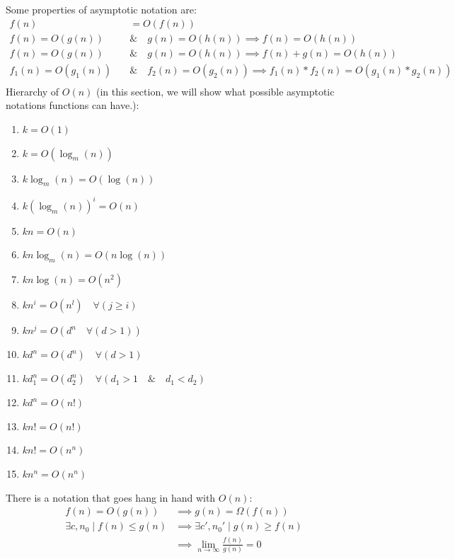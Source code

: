 \documentclass[nobib]{tufte-handout}
\begin{document}
Some properties of asymptotic notation are:
\begin{align*}
    f(n)                  & =O(f(n))                                                            \\
    f(n)=O(g(n))\quad     & \& \quad g(n) = O(h(n)) \implies f(n)=O(h(n))                       \\
    f(n)=O(g(n))\quad     & \& \quad g(n) = O(h(n)) \implies f(n)+g(n)=O(h(n))                  \\
    f_1(n)=O(g_1(n))\quad & \& \quad f_2(n) = O(g_2(n)) \implies f_1(n)*f_2(n)=O(g_1(n)*g_2(n)) \\
\end{align*}
Hierarchy of $O(n)$ (in this section, we will show what possible asymptotic notations functions can have.):\\
\begin{enumerate}
    \item $k=O(1)$
    \item $k=O(\log_m(n))$
    \item $k\log_m(n)=O(\log(n))$
    \item $k{(\log_m(n))}^i=O(n)$
    \item $kn=O(n)$
    \item $kn\log_m(n)=O(n\log(n))$
    \item $kn\log(n)=O(n^2)$
    \item $kn^i=O(n^l) \quad \forall (j\geq i)$
    \item $kn^j=O(d^n \quad \forall(d>1))$
    \item $kd^n=O(d^n)\quad \forall (d>1)$
    \item $kd_1^n=O(d_2^n) \quad \forall(d_1>1\quad \&\quad d_1<d_2)$
    \item $kd^n = O(n!)$
    \item $kn!=O(n!)$
    \item $kn!=O(n^n)$
    \item $kn^n=O(n^n)$
\end{enumerate}
There is a notation that goes hang in hand with $O(n)$:
\begin{align*}
    f(n)=O(g(n))                      & \implies g(n)=\Omega(f(n))                            \\
    \exists c, n_0 \mid f(n)\leq g(n) & \implies \exists c', n_0' \mid g(n)\geq f(n)          \\
                                      & \implies \lim_{n\rightarrow\infty}\frac{f(n)}{g(n)}=0
\end{align*}
\end{document}
